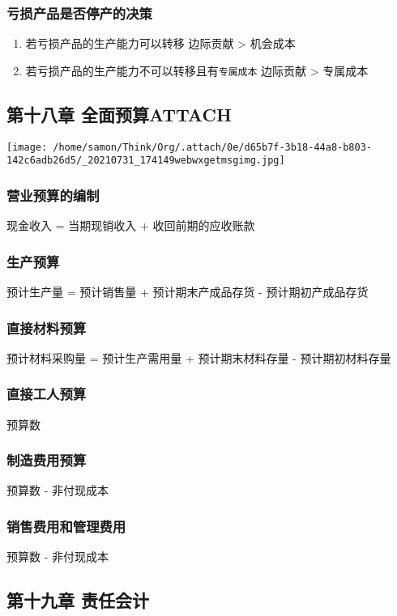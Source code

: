 \documentclass[12pt,a4paper]{article}
\begin{document}
\subsubsection{亏损产品是否停产的决策}
\label{sec:orga316bab}
\begin{enumerate}
\item 若亏损产品的生产能力可以转移
边际贡献 > 机会成本
\item 若亏损产品的生产能力不可以转移且有\texttt{专属成本}
边际贡献 > 专属成本
\end{enumerate}
\subsection{第十八章 全面预算\hfill{}\textsc{ATTACH}}
\label{sec:orgc0f9a1c}
\begin{center}
\texttt{[image: /home/samon/Think/Org/.attach/0e/d65b7f-3b18-44a8-b803-142c6adb26d5/\_20210731\_174149webwxgetmsgimg.jpg]}
\end{center}
\subsubsection{营业预算的编制}
\label{sec:orgca56ea2}
现金收入 = 当期现销收入 + 收回前期的应收账款
\subsubsection{生产预算}
\label{sec:orgfe41678}
预计生产量 = 预计销售量 + 预计期末产成品存货 - 预计期初产成品存货
\subsubsection{直接材料预算}
\label{sec:org0e06099}
预计材料采购量 = 预计生产需用量 + 预计期末材料存量 - 预计期初材料存量
\subsubsection{直接工人预算}
\label{sec:orgc15ad0e}
预算数
\subsubsection{制造费用预算}
\label{sec:orgbbeb64b}
预算数 - 非付现成本
\subsubsection{销售费用和管理费用}
\label{sec:orga03af4b}
预算数 - 非付现成本
\subsection{第十九章 责任会计}
\label{sec:org9b75f78}
\end{document}
